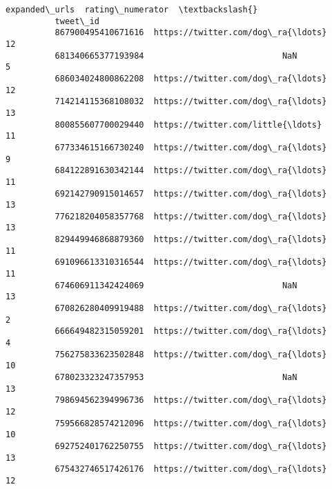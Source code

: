 \documentclass[11pt]{article}
\begin{document}
\begin{Verbatim}[commandchars=\\\{\}]
                                              expanded\_urls  rating\_numerator  \textbackslash{}
          tweet\_id                                                              
          867900495410671616  https://twitter.com/dog\_ra{\ldots}                12   
          681340665377193984                            NaN                 5   
          686034024800862208  https://twitter.com/dog\_ra{\ldots}                12   
          714214115368108032  https://twitter.com/dog\_ra{\ldots}                13   
          800855607700029440  https://twitter.com/little{\ldots}                11   
          677334615166730240  https://twitter.com/dog\_ra{\ldots}                 9   
          684122891630342144  https://twitter.com/dog\_ra{\ldots}                11   
          692142790915014657  https://twitter.com/dog\_ra{\ldots}                13   
          776218204058357768  https://twitter.com/dog\_ra{\ldots}                13   
          829449946868879360  https://twitter.com/dog\_ra{\ldots}                11   
          691096613310316544  https://twitter.com/dog\_ra{\ldots}                11   
          674606911342424069                            NaN                13   
          670826280409919488  https://twitter.com/dog\_ra{\ldots}                 2   
          666649482315059201  https://twitter.com/dog\_ra{\ldots}                 4   
          756275833623502848  https://twitter.com/dog\_ra{\ldots}                10   
          678023323247357953                            NaN                13   
          798694562394996736  https://twitter.com/dog\_ra{\ldots}                12   
          759566828574212096  https://twitter.com/dog\_ra{\ldots}                10   
          692752401762250755  https://twitter.com/dog\_ra{\ldots}                13   
          675432746517426176  https://twitter.com/dog\_ra{\ldots}                12   
          

\end{Verbatim}
\end{document}

